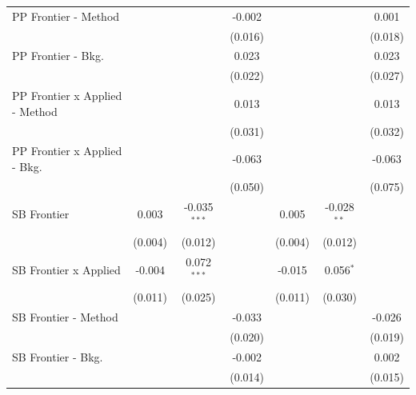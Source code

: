 \begin{tabular}{lcccccc}
   PP Frontier - Method           &                &                & -0.002  &                &               & 0.001\\   
                                  &                &                & (0.016) &                &               & (0.018)\\   
   PP Frontier - Bkg.             &                &                & 0.023   &                &               & 0.023\\   
                                  &                &                & (0.022) &                &               & (0.027)\\   
   PP Frontier x Applied - Method &                &                & 0.013   &                &               & 0.013\\   
                                  &                &                & (0.031) &                &               & (0.032)\\   
   PP Frontier x Applied - Bkg.   &                &                & -0.063  &                &               & -0.063\\   
                                  &                &                & (0.050) &                &               & (0.075)\\   
   SB Frontier                    & 0.003          & -0.035$^{***}$ &         & 0.005          & -0.028$^{**}$ &   \\   
                                  & (0.004)        & (0.012)        &         & (0.004)        & (0.012)       &   \\   
   SB Frontier x Applied          & -0.004         & 0.072$^{***}$  &         & -0.015         & 0.056$^{*}$   &   \\   
                                  & (0.011)        & (0.025)        &         & (0.011)        & (0.030)       &   \\   
   SB Frontier - Method           &                &                & -0.033  &                &               & -0.026\\   
                                  &                &                & (0.020) &                &               & (0.019)\\   
   SB Frontier - Bkg.             &                &                & -0.002  &                &               & 0.002\\   
                                  &                &                & (0.014) &                &               & (0.015)\\   

\end{tabular}
